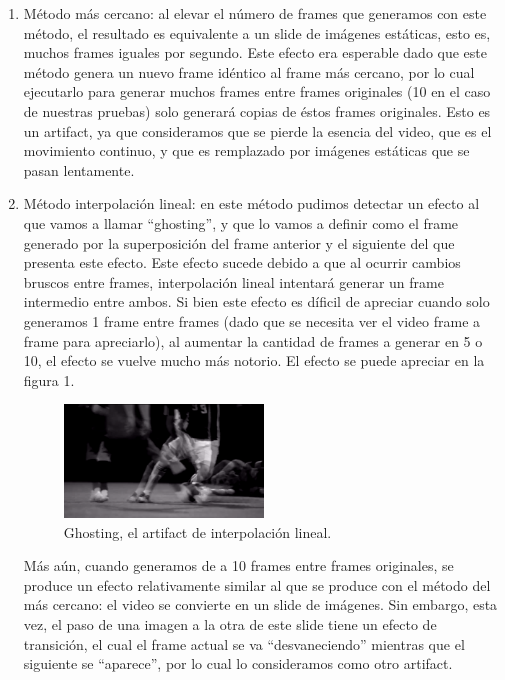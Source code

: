 \begin{enumerate}
\item M\'etodo m\'as cercano: al elevar el n\'umero de frames que generamos con este m\'etodo, el resultado es equivalente a un slide de im\'agenes est\'aticas, esto es, muchos frames iguales por segundo. Este efecto era esperable dado que este m\'etodo genera un nuevo frame id\'entico al frame m\'as cercano, por lo cual ejecutarlo para generar muchos frames entre frames originales (10 en el caso de nuestras pruebas) solo generar\'a copias de \'estos frames originales. Esto es un artifact, ya que consideramos que se pierde la esencia del video, que es el movimiento continuo, y que es remplazado por im\'agenes est\'aticas que se pasan lentamente.
\item M\'etodo interpolaci\'on lineal: en este m\'etodo pudimos detectar un efecto al que vamos a llamar ``ghosting'', y que lo vamos a definir como el frame generado por la superposici\'on del frame anterior y el siguiente del que presenta este efecto. Este efecto sucede debido a que al ocurrir cambios bruscos entre frames, interpolaci\'on lineal intentar\'a generar un frame intermedio entre ambos. Si bien este efecto es d\'ificil de apreciar cuando solo generamos 1 frame entre frames (dado que se necesita ver el video frame a frame para apreciarlo), al aumentar la cantidad de frames a generar en 5 o 10, el efecto se vuelve mucho m\'as notorio. El efecto se puede apreciar en la figura 1.

\begin{figure}[H]
  \centering
    \includegraphics[width=0.5\textwidth]{img/artifact_lineal.png}
  	\caption{Ghosting, el artifact de interpolaci\'on lineal.}
\end{figure}

M\'as a\'un, cuando generamos de a 10 frames entre frames originales, se produce un efecto relativamente similar al que se produce con el m\'etodo del m\'as cercano: el video se convierte en un slide de im\'agenes. Sin embargo, esta vez, el paso de una imagen a la otra de este slide tiene un efecto de transici\'on, el cual el frame actual se va ``desvaneciendo'' mientras que el siguiente se ``aparece'', por lo cual lo consideramos como otro artifact.


\end{enumerate}
